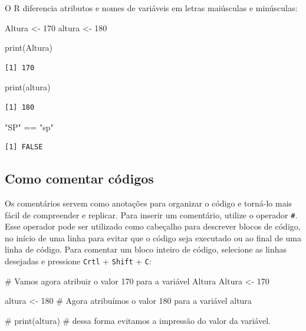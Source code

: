 \documentclass[
  letterpaper,
  DIV=11,
  numbers=noendperiod]{scrreprt}
\newenvironment{Shaded}{\begin{snugshade}}{\end{snugshade}}
\newcommand{\CommentTok}[1]{\textcolor[rgb]{0.37,0.37,0.37}{#1}}
\newcommand{\DecValTok}[1]{\textcolor[rgb]{0.68,0.00,0.00}{#1}}
\newcommand{\FunctionTok}[1]{\textcolor[rgb]{0.28,0.35,0.67}{#1}}
\newcommand{\NormalTok}[1]{\textcolor[rgb]{0.00,0.23,0.31}{#1}}
\newcommand{\OtherTok}[1]{\textcolor[rgb]{0.00,0.23,0.31}{#1}}
\newcommand{\SpecialCharTok}[1]{\textcolor[rgb]{0.37,0.37,0.37}{#1}}
\newcommand{\StringTok}[1]{\textcolor[rgb]{0.13,0.47,0.30}{#1}}
\begin{document}
O R diferencia atributos e nomes de variáveis em letras maiúsculas e
minúsculas:

\begin{Shaded}
\begin{Highlighting}[]
\NormalTok{Altura }\OtherTok{\textless{}{-}} \DecValTok{170}
\NormalTok{altura }\OtherTok{\textless{}{-}} \DecValTok{180}

\FunctionTok{print}\NormalTok{(Altura)}
\end{Highlighting}
\end{Shaded}

\begin{verbatim}
[1] 170
\end{verbatim}

\begin{Shaded}
\begin{Highlighting}[]
\FunctionTok{print}\NormalTok{(altura)}
\end{Highlighting}
\end{Shaded}

\begin{verbatim}
[1] 180
\end{verbatim}

\begin{Shaded}
\begin{Highlighting}[]
\StringTok{"SP"} \SpecialCharTok{==} \StringTok{"sp"}
\end{Highlighting}
\end{Shaded}

\begin{verbatim}
[1] FALSE
\end{verbatim}

\subsection{Como comentar códigos}\label{como-comentar-cuxf3digos}

Os comentários servem como anotações para organizar o código e torná-lo
mais fácil de compreender e replicar. Para inserir um comentário,
utilize o operador \texttt{\#}. Esse operador pode ser utilizado como
cabeçalho para descrever blocos de código, no início de uma linha para
evitar que o código seja executado ou ao final de uma linha de código.
Para comentar um bloco inteiro de código, selecione as linhas desejadas
e pressione \texttt{Crtl} + \texttt{Shift} + \texttt{C}:

\begin{Shaded}
\begin{Highlighting}[]
\CommentTok{\# Vamos agora atribuir o valor 170 para a variável Altura}
\NormalTok{Altura }\OtherTok{\textless{}{-}} \DecValTok{170}

\NormalTok{altura }\OtherTok{\textless{}{-}} \DecValTok{180} \CommentTok{\# Agora atribuímos o valor 180 para a variável altura}

\CommentTok{\# print(altura) \# dessa forma evitamos a impressão do valor da variável.}
\end{Highlighting}
\end{Shaded}
\end{document}
